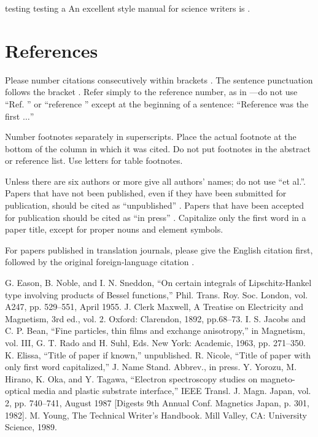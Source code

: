 \documentclass[conference]{main}
\begin{document}
testing testing a
An excellent style manual for science writers is \cite{b7}.

\section*{References}

Please number citations consecutively within brackets \cite{b1}. The
sentence punctuation follows the bracket \cite{b2}. Refer simply to the reference
number, as in \cite{b3}---do not use ``Ref. \cite{b3}'' or ``reference \cite{b3}'' except at
the beginning of a sentence: ``Reference \cite{b3} was the first $\ldots$''

Number footnotes separately in superscripts. Place the actual footnote at
the bottom of the column in which it was cited. Do not put footnotes in the
abstract or reference list. Use letters for table footnotes.

Unless there are six authors or more give all authors' names; do not use
``et al.''. Papers that have not been published, even if they have been
submitted for publication, should be cited as ``unpublished'' \cite{b4}. Papers
that have been accepted for publication should be cited as ``in press'' \cite{b5}.
Capitalize only the first word in a paper title, except for proper nouns and
element symbols.

For papers published in translation journals, please give the English
citation first, followed by the original foreign-language citation \cite{b6}.

\begin{thebibliography}{00}
 G. Eason, B. Noble, and I. N. Sneddon, ``On certain integrals of Lipschitz-Hankel type involving products of Bessel functions,'' Phil. Trans. Roy. Soc. London, vol. A247, pp. 529--551, April 1955.
 J. Clerk Maxwell, A Treatise on Electricity and Magnetism, 3rd ed., vol. 2. Oxford: Clarendon, 1892, pp.68--73.
 I. S. Jacobs and C. P. Bean, ``Fine particles, thin films and exchange anisotropy,'' in Magnetism, vol. III, G. T. Rado and H. Suhl, Eds. New York: Academic, 1963, pp. 271--350.
 K. Elissa, ``Title of paper if known,'' unpublished.
 R. Nicole, ``Title of paper with only first word capitalized,'' J. Name Stand. Abbrev., in press.
 Y. Yorozu, M. Hirano, K. Oka, and Y. Tagawa, ``Electron spectroscopy studies on magneto-optical media and plastic substrate interface,'' IEEE Transl. J. Magn. Japan, vol. 2, pp. 740--741, August 1987 [Digests 9th Annual Conf. Magnetics Japan, p. 301, 1982].
 M. Young, The Technical Writer's Handbook. Mill Valley, CA: University Science, 1989.
\end{thebibliography}
\end{document}
